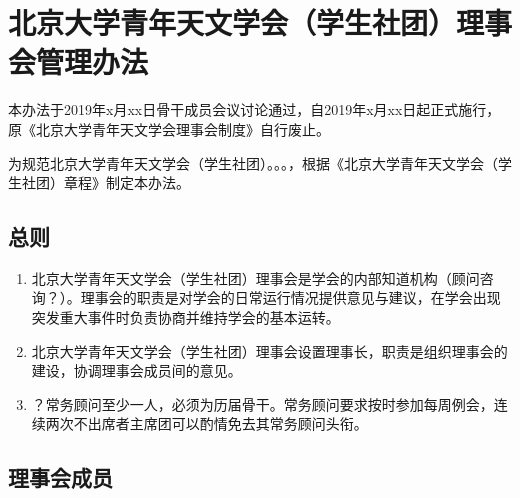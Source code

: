 \chapter{北京大学青年天文学会（学生社团）理事会管理办法}

本办法于2019年x月xx日骨干成员会议讨论通过，自2019年x月xx日起正式施行，原《北京大学青年天文学会理事会制度》自行废止。

为规范北京大学青年天文学会（学生社团）。。。，根据《北京大学青年天文学会（学生社团）章程》制定本办法。

\section{总则}

\begin{enumerate}
    \item 北京大学青年天文学会（学生社团）理事会是学会的内部知道机构（顾问咨询？）。理事会的职责是对学会的日常运行情况提供意见与建议，在学会出现突发重大事件时负责协商并维持学会的基本运转。
    
    \item 北京大学青年天文学会（学生社团）理事会设置理事长，职责是组织理事会的建设，协调理事会成员间的意见。
    
    \item ？常务顾问至少一人，必须为历届骨干。常务顾问要求按时参加每周例会，连续两次不出席者主席团可以酌情免去其常务顾问头衔。
\end{enumerate}

\section{理事会成员}

